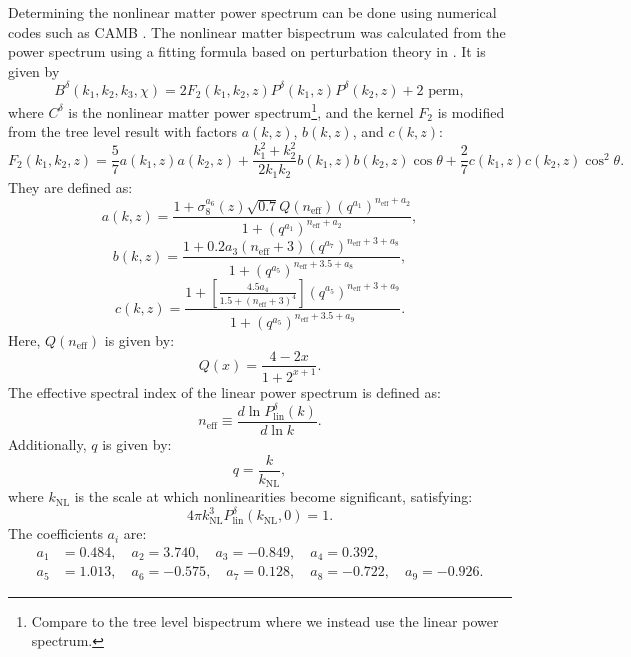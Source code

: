 \documentclass[11pt]{article} %
\begin{document}
Determining the nonlinear matter power spectrum can be done using numerical codes such as CAMB \cite{Lewis2000}. The nonlinear matter bispectrum was calculated from the power spectrum using a fitting formula based on perturbation theory in \cite{bispfit}. It is given by
\begin{equation}
    B^\delta(k_1, k_2, k_3, \chi) = 2 F_2(k_1, k_2, z) P^\delta(k_1, z) P^\delta(k_2, z) + \text{2 perm},
\end{equation}
where \( C^\delta \) is the nonlinear matter power spectrum\footnote{Compare to the tree level bispectrum where we instead use the linear power spectrum.}, and the kernel \( F_2 \) is modified from the tree level result with factors \( a(k, z) \), \( b(k, z) \), and \( c(k, z) \):
\begin{equation}
    F_2(k_1, k_2, z) = \frac{5}{7} a(k_1, z) a(k_2, z) + \frac{k_1^2 + k_2^2}{2 k_1 k_2} b(k_1, z) b(k_2, z) \cos \theta + \frac{2}{7} c(k_1, z) c(k_2, z) \cos^2 \theta.
\end{equation}
They are defined as:
\begin{equation}
    a(k, z) = \frac{1 + \sigma_8^{a_6}(z) \sqrt{0.7} Q(n_{\text{eff}}) (q^{a_1})^{n_{\text{eff}} + a_2}}{1 + (q^{a_1})^{n_{\text{eff}} + a_2}},
\end{equation}
\begin{equation}
    b(k, z) = \frac{1 + 0.2 a_3 (n_{\text{eff}} + 3) (q^{a_7})^{n_{\text{eff}} + 3 + a_8}}{1 + (q^{a_5})^{n_{\text{eff}} + 3.5 + a_8}},
\end{equation}
\begin{equation}
    c(k, z) = \frac{1 + \left[ \frac{4.5 a_4}{1.5 + (n_{\text{eff}} + 3)^4} \right] (q^{a_5})^{n_{\text{eff}} + 3 + a_9}}{1 + (q^{a_5})^{n_{\text{eff}} + 3.5 + a_9}}.
\end{equation}
Here, \( Q(n_{\text{eff}}) \) is given by:
\begin{equation}
    Q(x) = \frac{4 - 2x}{1 + 2^{x+1}}.
\end{equation}
The effective spectral index of the linear power spectrum is defined as:
\begin{equation}
    n_{\text{eff}} \equiv \frac{d \ln P^\delta_{\text{lin}}(k)}{d \ln k}.
\end{equation}
Additionally, \( q \) is given by:
\begin{equation}
    q = \frac{k}{k_{\text{NL}}},
\end{equation}
where \( k_{\text{NL}} \) is the scale at which nonlinearities become significant, satisfying:
\begin{equation}
    4 \pi k_{\text{NL}}^3 P^\delta_{\text{lin}}(k_{\text{NL}}, 0) = 1.
\end{equation}
The coefficients \( a_i \) are:
\begin{align*}
    a_1 &= 0.484, \quad a_2 = 3.740, \quad a_3 = -0.849, \quad a_4 = 0.392, \\
    a_5 &= 1.013, \quad a_6 = -0.575, \quad a_7 = 0.128, \quad a_8 = -0.722, \quad a_9 = -0.926.
\end{align*}
\end{document}
